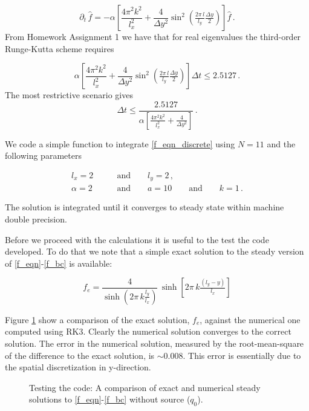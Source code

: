 \documentclass[11pt]{article}
\newcommand{\com}{\, ,}
\newcommand{\per}{\, .}
\def\beq{\begin{equation}}
\def\eeq{\end{equation}}
\begin{document}
\begin{enumerate}[label=(\alph*)]
        \beq
        \partial_t\,\hat f = - \alpha\left[\frac{4\pi^2k^2}{l_x^2} + \frac{4}{\Delta y^2}\sin^2\left(\tfrac{2\pi\,l}{l_y}\tfrac{\Delta y}{2}\right)\right] \hat f \per
        \eeq
        From Homework Assignment 1 we have that for real eigenvalues the third-order Runge-Kutta scheme requires

        \beq
             \alpha\left[\frac{4\pi^2k^2}{l_x^2} + \frac{4}{\Delta y^2}\sin^2\left(\tfrac{2\pi\,l}{l_y}\tfrac{\Delta y}{2}\right)\right] \Delta t \leq 2.5127\per
        \eeq
        The most restrictive scenario gives 
        \beq
        \label{stability_rk3}
        \Delta t \leq \frac{2.5127}{\alpha\left[\frac{4\pi^2k^2}{l_x^2} + \frac{4}{\Delta y^2}\right] }\per
        \eeq

        We code a simple function to integrate \eqref{f_eqn_discrete} using $N=11$ and the following parameters

        \begin{align}
            l_x = 2& \qquad\text{and}\qquad l_y=2\com \nonumber\\
            \alpha = 2 & \qquad\text{and}\qquad a=10 \qquad \text{and}\qquad k=1\per
        \end{align}


        The solution is integrated until it converges to steady state within machine double precision. 
        
        Before we proceed with the calculations it is useful to the test the code developed. To do that we note that a simple exact solution to the steady version of \eqref{f_eqn}-\eqref{f_bc} is available:

        \beq
            \label{f_bcc}
            f_e  = \frac{4}{\sinh{\left(2\pi\,k\tfrac{l_y}{l_x}\right)}}\,\sinh{\left[2\pi\,k\tfrac{\left(l_y-y\right)}{l_x}\right]}
        \eeq


        Figure \ref{comp_exact} show a comparison of the exact solution, $f_e$, against the numerical one computed using RK3. Clearly the numerical solution converges to the correct solution. The error in the numerical solution, measured by the root-mean-square of the difference to the exact solution, is $\sim 0.008$. This error is essentially due to the spatial discretization in y-direction.

        \begin{figure}[p]
        \centerline{}
        \caption{Testing the code: A comparison of exact and numerical steady solutions to  \eqref{f_eqn}-\eqref{f_bc} without source ($q_0$).}
        \label{comp_exact}
        \end{figure}



\end{enumerate}
\end{document}
